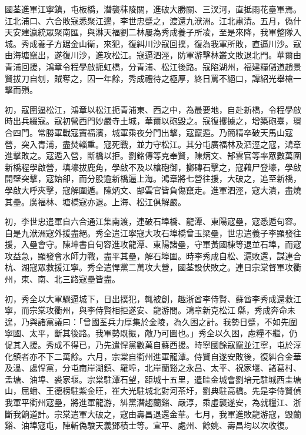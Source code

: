 \begin{pinyinscope}
國荃進軍江寧鎮，屯板橋，潛襲秣陵關，進破大勝關、三汊河，直抵雨花臺軍焉。江北浦口、六合敗寇悉聚江邊，李世忠蹙之，渡還九洑洲。江北肅清。五月，偽什天安建瀛統眾聚南匯，與淋天福劉二林屢為秀成養子所凌，至是來降，我軍整隊入城。秀成養子方踞金山衛，來犯，復糾川沙寇回撲，復為我軍所敗，直逼川沙。寇由海塘竄出，遂復川沙，進攻松江。寇逼泗涇，防軍游擊林叢文敗退北門。華爾由青浦回援，鴻章令程學啟扼虹橋，分青浦、松江後路。寇陷湖州，福建糧儲道趙景賢拔刀自刎，賊奪之，囚一年餘，秀成禮待之極厚，終日罵不絕口，譚紹光舉槍一擊而殞。

初，寇圍逼松江，鴻章以松江扼青浦東、西之中，為最要地，自赴新橋，令程學啟時出兵綴寇。寇初營西門妙嚴寺土城，華爾以砲毀之。寇復攫據之，增築砲臺，環合四門。常勝軍戰寇竇福濱，城軍乘夜分門出擊，寇竄遁。乃簡精卒破天馬山寇營，突入青浦，盡焚輜重。寇死戰，並力守松江。其分屯廣福林及泗涇之寇，鴻章進擊敗之。寇遁入營，斷橋以拒。劉銘傳等克奉賢，陳炳文、郜雲官等率眾數萬圍新橋程學啟營，填壕拔鹿角，學啟不及以槍砲御，擲磚石擊之，寇藉尸登壕，學啟開壁突擊，寇始卻，而分股逾新橋逼上海。鴻章將七營往援，大破之，追至新橋，學啟大呼夾擊，寇解圍遁。陳炳文、郜雲官皆負傷竄走。進軍泗涇，寇大潰，盡燒其壘。廣福林、塘橋寇亦退。上海、松江俱解嚴。

初，李世忠遣軍自六合通江集南渡，連破石埠橋、龍潭、東陽寇壘，寇悉遁句容。自是九洑洲寇外援盡絕。秀全遣江寧寇大攻石埠橋曾玉梁壘，世忠遣義子李顯發往援，入壘會守。陳坤書自句容進攻龍潭、東陽諸壘，守軍黃國棟等退並石埠，而寇攻益急，顯發會水師力戰，盡平其壘，解石埠圍。時李秀成自松、滬敗還，謀連合杭、湖寇眾救援江寧。秀全遣悍黨二萬攻大營，國荃設伏敗之。連日宗棠督軍攻衢州，東、南、北三路寇壘皆盡。

初，秀全以大軍驟逼城下，日出撲犯，輒被創，趣浙酋李侍賢、蘇酋李秀成還救江寧，而宗棠攻衢州，與李侍賢相拒遂安、龍游間。鴻章新克松江縣，秀成奔命未遑，乃與諸黨議曰：「曾國荃兵力厚集於金陵，為久困之計。我勢日蹙，不如先圍寧國、太平，斷其後路。我軍勢既振，敵乃可圖也。」秀全以久困，慮糧不繼，仍促其入援。秀成不得已，乃先遣悍黨數萬自蘇西援。時寧國餘寇竄並江寧，屯於淳化鎮者亦不下二萬餘。六月，宗棠自衢州進軍龍潭。侍賢自遂安敗後，復糾合金華及溫、處悍黨，分屯南岸湖鎮、羅埠，北岸蘭谿之永昌、太平、祝家堰、諸葛村、孟塘、油埠、裘家堰。宗棠駐潭石望，距城十五里，遣眭金城會劉培元駐城西圭塘山，屈蟠、王德榜駐紫金旺，崔大光駐城北對河茶圩，劉典駐高橋。先是李侍賢偵我軍平衢州寇壘，將進軍龍游，糾黨潛趨蘭谿、嚴淳，乘虛襲遂安，為就糧江、浙斷我餉道計。宗棠遣軍大破之，寇由壽昌退還金華。七月，我軍進敗龍游寇，毀蘭谿、油埠寇屯，陣斬偽駿天義鄧積士等。宣平、處州、餘姚、壽昌均以次收復。


\end{pinyinscope}
